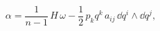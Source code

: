 \begin{equation}
  \alpha = \frac{1}{n-1}\,H\,\omega
  - \frac{1}{2}\,p_k q^k\,a_{ij}\,
  \dd q^i\wedge\dd q^j,
\label{lsysalpha}
\end{equation}

